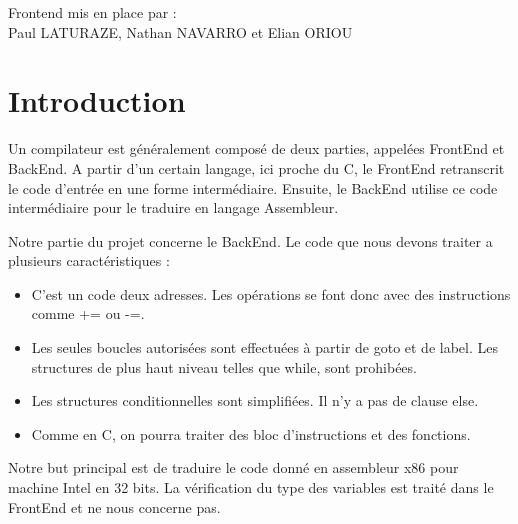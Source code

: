 Frontend mis en place par :\\ Paul LATURAZE, Nathan NAVARRO et Elian ORIOU

\vspace{0.5cm}
\section*{Introduction}

\vspace{0.5cm}
Un compilateur est généralement composé de deux parties, appelées FrontEnd et BackEnd. A partir d'un certain langage, ici proche du C, le FrontEnd retranscrit le code d'entrée en une forme intermédiaire. Ensuite, le BackEnd utilise ce code intermédiaire pour le traduire en langage Assembleur. 

\vspace{0.5cm}
Notre partie du projet concerne le BackEnd. 
Le code que nous devons traiter a plusieurs caractéristiques :
\begin{itemize}
\item C'est un code deux adresses. Les opérations se font donc avec des instructions comme += ou -=. 
\item Les seules boucles autorisées sont effectuées à partir de goto et de label. Les structures de plus haut niveau telles que while, sont prohibées.
\item Les structures conditionnelles sont simplifiées. Il n'y a pas de clause else.
\item Comme en C, on pourra traiter des bloc d'instructions et des fonctions.
\end{itemize}

\vspace{0.5cm}
Notre but principal est de traduire le code donné en assembleur x86 pour machine Intel en 32 bits. La vérification du type des variables est traité dans le FrontEnd et ne nous concerne pas.